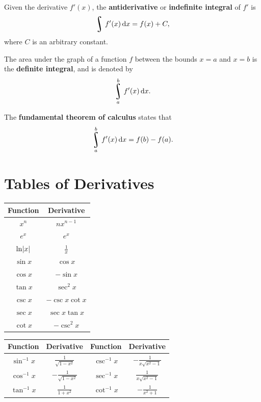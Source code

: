 \documentclass[a4paper]{amsbook}
\theoremstyle{definition}
\numberwithin{exercise}{chapter}
\numberwithin{exercise}{chapter}
\DeclareMathOperator*{\rint}{\scalerel*{\rotatebox{17}{$\!\int\!$}}{\int}}
\begin{document}
Given the derivative $ f'(x) $, the \textbf{antiderivative} or \textbf{indefinite integral} of $ f' $ is
\begin{displaymath}
  \rint f'(x) \dif{x} = f(x) + C,
\end{displaymath}
where $ C $ is an arbitrary constant.

The area under the graph of a function $ f $ between the bounds $ x = a $ and $ x = b $ is the \textbf{definite integral},
and is denoted by
\begin{displaymath}
  \rint^b_a f'(x) \dif{x}.
\end{displaymath}

The \textbf{fundamental theorem of calculus} states that
\begin{displaymath}
  \rint^b_a f'(x) \dif{x} = f(b) - f(a).
\end{displaymath}

\section*{Tables of Derivatives}

\begin{center}
  \def\arraystretch{1.5}
  \begin{tabular}{|c|c|}\hline
    \textbf{Function} & \textbf{Derivative}\\\hline
    $ x^n $ & $ nx^{n - 1} $\\\hline
    $ e^x $ & $ e^x $\\\hline
    $ \ln \abs{x} $ & $ \frac{1}{x} $\\\hline
    $ \sin x $ & $ \cos x $\\\hline
    $ \cos x $ & $ -\sin x $\\\hline
    $ \tan x $ & $ \sec^2 x $\\\hline
    $ \csc x $ & $ -\csc x \cot x $\\\hline
    $ \sec x $ & $ \sec x \tan x $\\\hline
    $ \cot x $ & $ -\csc^2 x $\\\hline
  \end{tabular}
  \begin{tabular}{|c|c|c|c|}\hline
    \textbf{Function} & \textbf{Derivative} &
    \textbf{Function} & \textbf{Derivative}\\\hline
    $ \sin^{-1} x $ & $ \frac{1}{\sqrt{1 - x^2}} $ &
    $ \csc^{-1} x $ & $ -\frac{1}{x\sqrt{x^2 - 1}} $ \\\hline
    $ \cos^{-1} x $ & $ -\frac{1}{\sqrt{1 - x^2}} $ &
    $ \sec^{-1} x $ & $ \frac{1}{x\sqrt{x^2 - 1}} $\\\hline
    $ \tan^{-1} x $ & $ \frac{1}{1+x^2} $ &
    $ \cot^{-1} x $ & $ -\frac{1}{x^2 + 1}$\\\hline
  \end{tabular}
\end{center}
\end{document}

